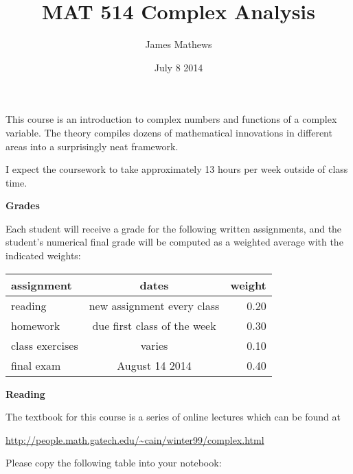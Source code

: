 \documentclass[12pt]{article}
\date{July 8 2014}
\title{MAT 514 Complex Analysis}
\author{James Mathews}
\begin{document}
\maketitle
\setlength\parindent{0pt}

This course is an introduction to complex numbers and functions of a complex variable.  The theory compiles dozens of mathematical innovations in different areas into a surprisingly neat framework.

I expect the coursework to take approximately 13 hours per week outside of class time.

\begin{center}\textbf{Grades}\end{center}

Each student will receive a grade for the following written assignments, and the student's numerical final grade will be computed as a weighted average with the indicated weights:

\begin{center}
  \begin{tabular}{ l | c || r }
    assignment & dates & weight \\ \hline
    reading & new assignment every class & 0.20 \\
    homework & due first class of the week & 0.30 \\
    class exercises & varies & 0.10\\
    final exam &  August 14 2014 & 0.40
  \end{tabular}
\end{center}

\begin{center}\textbf{Reading}\end{center}

The textbook for this course is a series of online lectures which can be found at

\begin{center}\url{http://people.math.gatech.edu/~cain/winter99/complex.html}\end{center}

Please copy the following table into your notebook:
\end{document}

